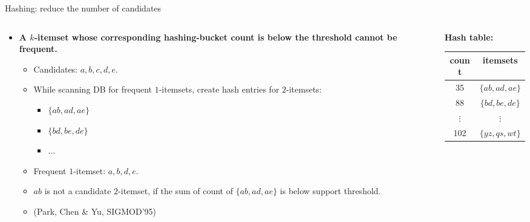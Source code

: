 \documentclass[aspectratio=169,t]{beamer}
\begin{document}
  { 
    \begin{frame}{Hashing: reduce the number of candidates}
    \begin{columns}
      \begin{column}{0.6\textwidth}
      \begin{itemize}
        \item \textbf{A $k$-itemset whose corresponding hashing-bucket count is below the threshold cannot be frequent.}
        \begin{itemize}
          \item Candidates: $a,b,c,d,e$.
          \item While scanning DB for frequent $1$-itemsets, create hash entries for $2$-itemsets:
          \begin{itemize}
            \item $\{ab,ad,ae\}$
            \item $\{bd,be,de\}$
            \item $\ldots$
          \end{itemize}
          \item Frequent $1$-itemset: $a,b,d,e$.
          \item $ab$ is not a candidate $2$-itemset, if the sum of count of $\{ab, ad, ae\}$ is below support threshold.
          \item (Park, Chen \& Yu, SIGMOD'95)
        \end{itemize}
      \end{itemize}
      \end{column}
      \begin{column}{0.3\textwidth}
      \centering
      \textbf{Hash table:}\\
      \begin{tabular}{| c | c |}
      \hline
      count & itemsets \\\hline
      35 & $\{ab,ad,ae\}$\\\hline
      88 & $\{bd,be,de\}$\\\hline
      $\vdots$ & $\vdots$\\\hline
      102 & $\{yz,qs,wt\}$\\\hline
      \end{tabular}
      \end{column}
    \end{columns}
    \end{frame}
  }
\end{document}
